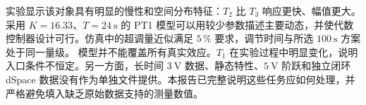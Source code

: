 实验显示该对象具有明显的慢性和空间分布特征：$T_2$ 比 $T_3$ 响应更快、幅值更大。采用 $K = 16.33$、$T = \SI{24}{\second}$ 的 PT1 模型可以用较少参数描述主要动态，并使代数控制器设计可行。仿真中的超调量近似满足 $5\,\%$ 要求，调节时间与所选 $\SI{100}{\second}$ 方案处于同一量级。
模型并不能覆盖所有真实效应。$T_1$ 在实验过程中明显变化，说明入口条件不恒定。另一方面，长时间 $\SI{3}{\volt}$ 数据、静态特性、$\SI{5}{\volt}$ 阶跃和独立闭环 dSpace 数据没有作为单独文件提供。本报告已完整说明这些任务应如何处理，并严格避免填入缺乏原始数据支持的测量数值。
